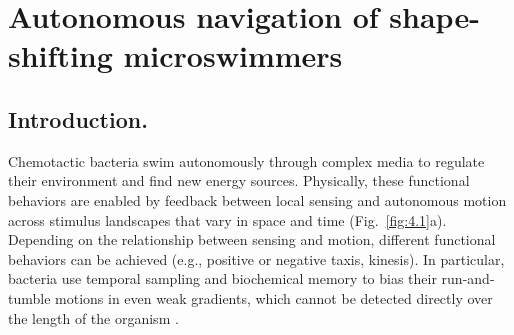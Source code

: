 \chapter{Autonomous navigation of shape-shifting microswimmers}
\section{Introduction.}
Chemotactic bacteria swim autonomously through complex media to regulate their environment and find new energy sources. Physically, these functional behaviors are enabled by feedback between local sensing and autonomous motion across stimulus landscapes that vary in space and time (Fig.\ \ref{fig:4.1}a). Depending on the relationship between sensing and motion, different functional behaviors can be achieved (e.g., positive or negative taxis, kinesis). In particular, bacteria use temporal sampling and biochemical memory to bias their run-and-tumble motions in even weak gradients, which cannot be detected directly over the length of the organism \cite{cates2012diffusive}.  

